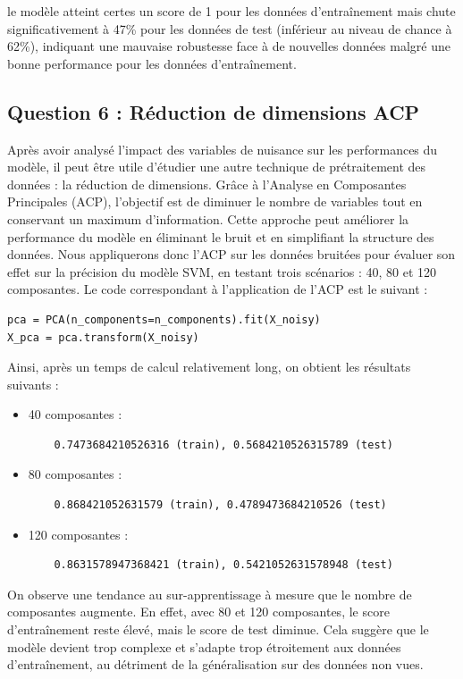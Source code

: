 \documentclass{article}
\begin{document}
le modèle atteint certes un score de 1 pour les données d'entraînement mais chute significativement à 47\% pour les données de test (inférieur au niveau de chance à 62\%), indiquant une mauvaise robustesse face à de nouvelles données malgré une bonne performance pour les données d'entraînement.

\subsection{Question 6 : Réduction de dimensions ACP}
\hspace{7pt} Après avoir analysé l'impact des variables de nuisance sur les performances du modèle, il peut être utile d'étudier une autre technique de prétraitement des données : la réduction de dimensions. Grâce à l'Analyse en Composantes Principales (ACP), l'objectif est de diminuer le nombre de variables tout en conservant un maximum d'information. Cette approche peut améliorer la performance du modèle en éliminant le bruit et en simplifiant la structure des données. Nous appliquerons donc l'ACP sur les données bruitées pour évaluer son effet sur la précision du modèle SVM, en testant trois scénarios : 40, 80 et 120 composantes. Le code correspondant à l'application de l'ACP est le suivant :
\begin{lstlisting}
pca = PCA(n_components=n_components).fit(X_noisy)
X_pca = pca.transform(X_noisy)
\end{lstlisting}

\hspace{7pt} Ainsi, après un temps de calcul relativement long, on obtient les résultats suivants :
\begin{itemize}
    \item 40 composantes : 
    \begin{lstlisting}
    0.7473684210526316 (train), 0.5684210526315789 (test) 
    \end{lstlisting}
    \item 80 composantes :
    \begin{lstlisting}
    0.868421052631579 (train), 0.4789473684210526 (test) 
    \end{lstlisting}
    \item 120 composantes : 
    \begin{lstlisting}
    0.8631578947368421 (train), 0.5421052631578948 (test) 
    \end{lstlisting}
\end{itemize}

\hspace{7pt} On observe une tendance au sur-apprentissage à mesure que le nombre de composantes augmente. En effet, avec 80 et 120 composantes, le score d'entraînement reste élevé, mais le score de test diminue. Cela suggère que le modèle devient trop complexe et s'adapte trop étroitement aux données d'entraînement, au détriment de la généralisation sur des données non vues.
\newline
\end{document}
